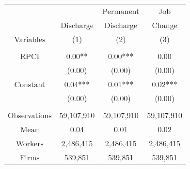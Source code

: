 \begin{tabular}{c|ccc}
\toprule
\toprule
      &       & Permanent & Job \\
      & Discharge & Discharge & Change \\
Variables & (1) & (2) & (3) \\
\midrule
      &       &       &  \\
RPCI  & 0.00** & 0.00*** & 0.00 \\
      & (0.00) & (0.00) & (0.00) \\
Constant & 0.04*** & 0.01*** & 0.02*** \\
      & (0.00) & (0.00) & (0.00) \\
      &       &       &  \\
\midrule
Observations & 59,107,910 & 59,107,910 & 59,107,910 \\
Mean  & 0.04  & 0.01  & 0.02 \\
Workers & 2,486,415 & 2,486,415 & 2,486,415 \\
Firms & 539,851 & 539,851 & 539,851 \\
\bottomrule
\bottomrule
\end{tabular}%
